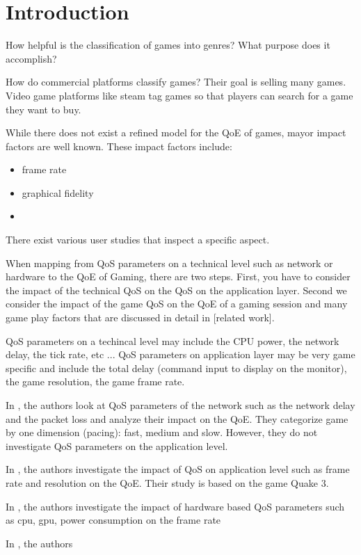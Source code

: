 
\section{Introduction}

How helpful is the classification of games into genres? What purpose does it accomplish?

How do commercial platforms classify games? Their goal is selling many games. Video game platforms like steam tag games so that players can search for a game they want to buy. 

While there does not exist a refined model for the QoE of games, mayor impact factors are well known. These impact factors include:
\begin{itemize}
\item frame rate
\item graphical fidelity
\item 
\end{itemize}

There exist various user studies that inspect a specific aspect.

When mapping from QoS parameters on a technical level such as network or hardware to the QoE of Gaming, there are two steps. First, you have to consider the impact of the technical QoS on the QoS on the application layer. Second we consider the impact of the game QoS on the QoE of a gaming session and many game play factors that are discussed in detail in [related work].

QoS parameters on a techincal level may include the CPU power, the network delay, the tick rate, etc ...
QoS parameters on application layer may be very game specific and include the total delay (command input to display on the monitor), the game resolution, the game frame rate.

In \cite{jarschel2011evaluation}, the authors look at QoS parameters of the network such as the network delay and the packet loss and analyze their impact on the QoE. They categorize game by one dimension (pacing): fast, medium and slow. However, they do not investigate QoS parameters on the application level.

In \cite{claypool2006effects}, the authors investigate the impact of QoS on application level such as frame rate and resolution on the QoE. Their study is based on the game Quake 3.

In \cite{pathania2014integrated}, the authors investigate the impact of hardware based QoS parameters such as cpu, gpu, power consumption on the frame rate

In \cite{claypool2006latency}, the authors 

